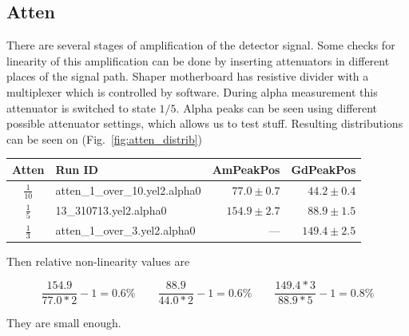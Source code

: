 \documentclass[a4paper]{article}
\begin{document}
\subsection{Atten}

There are several stages of amplification of the detector signal. Some checks
for linearity of this amplification can be done by inserting attenuators in
different places of the signal path. Shaper motherboard has resistive divider
with a multiplexer which is controlled by software. During alpha measurement
this attenuator is switched to state $1/5$. Alpha peaks can be seen using
different possible attenuator settings, which allows us to test stuff.
Resulting distributions can be seen on (Fig.~\ref{fig:atten_distrib})

\begin{tabular}{clrr}
\toprule
Atten   &       Run ID & AmPeakPos      & GdPeakPos \\
\midrule
$\frac{1}{10}$  & \small{atten\_1\_over\_10.yel2.alpha0}        & $77.0\pm0.7$          & $44.2\pm0.4$ \\
\addlinespace
$\frac{1}{5}$   & \small{13\_310713.yel2.alpha0}                & $154.9\pm2.7$         & $88.9\pm1.5$ \\
\addlinespace
$\frac{1}{3}$   & \small{atten\_1\_over\_3.yel2.alpha0}         & ---\hspace{20pt}      & $149.4\pm2.5$ \\
\bottomrule
\end{tabular}

Then relative non-linearity values are

\begin{equation}
\frac{154.9}{77.0*2} - 1 = 0.6\%
\qquad
\frac{88.9}{44.0*2} - 1 = 0.6\%
\qquad
\frac{149.4*3}{88.9*5} - 1 = 0.8\%
\end{equation}

They are small enough.
\end{document}
